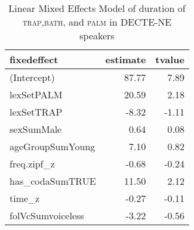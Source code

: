 \begin{table}[ht]
\centering
\begin{tabular}{lrr}
  \hline
fixedeffect & estimate & tvalue \\ 
  \hline
(Intercept) & 87.77 & 7.89 \\ 
  lexSetPALM & 20.59 & 2.18 \\ 
  lexSetTRAP & -8.32 & -1.11 \\ 
  sexSumMale & 0.64 & 0.08 \\ 
  ageGroupSumYoung & 7.10 & 0.82 \\ 
  freq.zipf\_z & -0.68 & -0.24 \\ 
  has\_codaSumTRUE & 11.50 & 2.12 \\ 
  time\_z & -0.27 & -0.11 \\ 
  folVcSumvoiceless & -3.22 & -0.56 \\ 
   \hline
\end{tabular}
\caption{Linear Mixed Effects Model of duration of \textsc{trap},\textsc{bath}, and \textsc{palm} in DECTE-NE speakers \label{tbl:TBPdurDE}} 
\end{table}
